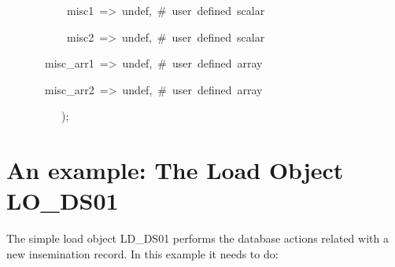 \begin{table}[htbp]
\begin{lyxcode}
~{\footnotesize ~~~~~~~~~~misc1~=>~undef,~\#~user~defined~scalar}{\footnotesize \par}

~{\footnotesize ~~~~~~~~~~misc2~=>~undef,~\#~user~defined~scalar}{\footnotesize \par}

~{\footnotesize ~~~~~~misc\_arr1~=>~undef,~\#~user~defined~array}{\footnotesize \par}

~{\footnotesize ~~~~~~misc\_arr2~=>~undef,~\#~user~defined~array}{\footnotesize \par}

~{\footnotesize ~~~~~~~~~);~}\end{lyxcode}

\end{table}



\section{An example: The Load Object LO\_DS01}

The simple load object LD\_DS01 performs the database actions related
with a new insemination record. In this example it needs to do:

